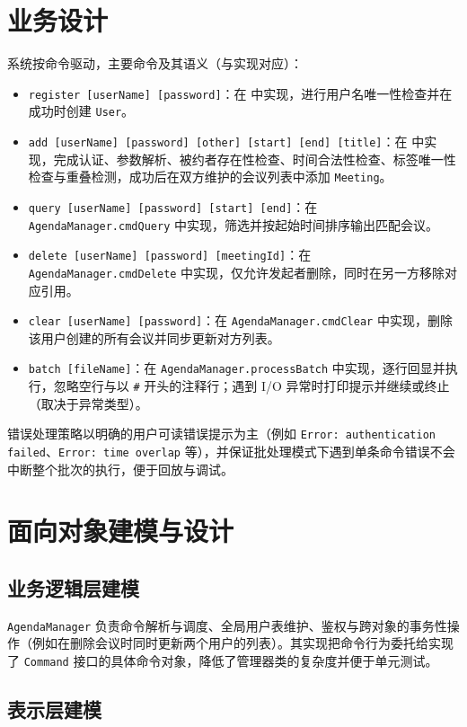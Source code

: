 \section{业务设计}

系统按命令驱动，主要命令及其语义（与实现对应）：
\begin{itemize}
  \item \texttt{register [userName] [password]}：在  中实现，进行用户名唯一性检查并在成功时创建 \texttt{User}。
  \item \texttt{add [userName] [password] [other] [start] [end] [title]}：在  中实现，完成认证、参数解析、被约者存在性检查、时间合法性检查、标签唯一性检查与重叠检测，成功后在双方维护的会议列表中添加 \texttt{Meeting}。
  \item \texttt{query [userName] [password] [start] [end]}：在 \texttt{AgendaManager.cmdQuery} 中实现，筛选并按起始时间排序输出匹配会议。
  \item \texttt{delete [userName] [password] [meetingId]}：在 \texttt{AgendaManager.cmdDelete} 中实现，仅允许发起者删除，同时在另一方移除对应引用。
  \item \texttt{clear [userName] [password]}：在 \texttt{AgendaManager.cmdClear} 中实现，删除该用户创建的所有会议并同步更新对方列表。
  \item \texttt{batch [fileName]}：在 \texttt{AgendaManager.processBatch} 中实现，逐行回显并执行，忽略空行与以 \texttt{\#} 开头的注释行；遇到 I/O 异常时打印提示并继续或终止（取决于异常类型）。
\end{itemize}


错误处理策略以明确的用户可读错误提示为主（例如 \texttt{Error: authentication failed}、\texttt{Error: time overlap} 等），并保证批处理模式下遇到单条命令错误不会中断整个批次的执行，便于回放与调试。

\section{面向对象建模与设计}
\subsection{业务逻辑层建模}

\texttt{AgendaManager} 负责命令解析与调度、全局用户表维护、鉴权与跨对象的事务性操作（例如在删除会议时同时更新两个用户的列表）。其实现把命令行为委托给实现了 \texttt{Command} 接口的具体命令对象，降低了管理器类的复杂度并便于单元测试。

\subsection{表示层建模}

